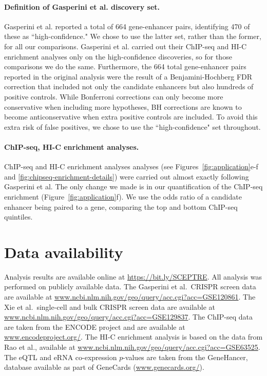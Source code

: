 \documentclass{nature}
\begin{document}
\paragraph{Definition of Gasperini et al. discovery set.}

Gasperini et al. reported a total of 664 gene-enhancer pairs, identifying 470 of these as ``high-confidence." We chose to use the latter set, rather than the former, for all our comparisons. Gasperini et al. carried out their ChIP-seq and HI-C enrichment analyses only on the high-confidence discoveries, so for those comparisons we do the same. Furthermore, the 664 total gene-enhancer pairs reported in the original analysis were the result of a Benjamini-Hochberg FDR correction that included not only the candidate enhancers but also hundreds of positive controls. While Bonferroni corrections can only become more conservative when including more hypotheses, BH corrections are known to become anticonservative when extra positive controls are included.\cite{FR01} To avoid this extra risk of false positives, we chose to use the ``high-confidence" set throughout.

\paragraph{ChIP-seq, HI-C enrichment analyses.}

ChIP-seq and HI-C enrichment analyses analyses (see Figures~\ref{fig:application}e-f and \ref{fig:chipseq-enrichment-details}) were carried out almost exactly following Gasperini et al. The only change we made is in our quantification of the ChIP-seq enrichment (Figure~\ref{fig:application}f). We use the odds ratio of a candidate enhancer being paired to a gene, comparing the top and bottom ChIP-seq quintiles.

\section*{Data availability}

Analysis results are available online at \url{https://bit.ly/SCEPTRE}. All analysis was performed on publicly available data. The Gasperini et al.\ CRISPR screen data\cite{Gasperini2019} are available at \url{www.ncbi.nlm.nih.gov/geo/query/acc.cgi?acc=GSE120861}. The Xie et al.\ single-cell and bulk CRISPR screen data are available at \url{www.ncbi.nlm.nih.gov/geo/query/acc.cgi?acc=GSE129837}. The ChIP-seq data are taken from the ENCODE project\cite{Dunham2012} and are available at \url{www.encodeproject.org/}. The HI-C enrichment analysis is based on the data from Rao et al.,\cite{Rao2014} available at \url{www.ncbi.nlm.nih.gov/geo/query/acc.cgi?acc=GSE63525}. The eQTL and eRNA co-expression $p$-values are taken from the GeneHancer, database\cite{Fishilevich2017} available as part of GeneCards (\url{www.genecards.org/}).
\end{document}
